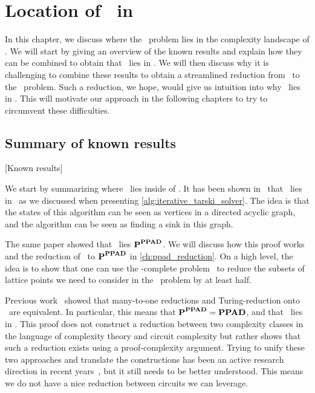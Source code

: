 \setchapterpreamble[u]{\margintoc}
\chapter{Location of \Tarski\ in \TFNP}\label{ch:location_tarski}

In this chapter, we discuss where the \Tarski\ problem lies in the complexity landscape of \TFNP\@. We will start by giving an overview of the known results and explain how they can be combined to obtain that \Tarski\ lies in \EOPL\@. We will then discuss why it is challenging to combine these results to obtain a streamlined reduction from \Tarski\ to the \EndOfPotentialLine\ problem. Such a reduction, we hope, would give us intuition into why \Tarski\ lies in \EOPL\@. This will motivate our approach in the following chapters to try to circumvent these difficulties.

\section{Summary of known results}[Known results]

We start by summarizing where \Tarski\ lies inside of \TFNP\@. It has been shown in~ that \Tarski\ lies in \PLS\ as we discussed when presenting \cref{alg:iterative_tarski_solver}. The idea is that the states of this algorithm can be seen as vertices in a directed acyclic graph, and the algorithm can be seen as finding a sink in this graph.

The same paper showed that \Tarski\ lies $\textbf{P}^{\textbf{PPAD}}$. We will discuss how this proof works and the reduction of \Tarski\ to $\textbf{P}^{\textbf{PPAD}}$ in \cref{ch:ppad_reduction}. On a high level, the idea is to show that one can use the \PPAD-complete problem \Brouwer\ to reduce the subsets of lattice points we need to consider in the \Tarski\ problem by at least half.

Previous work~ showed that many-to-one reductions and Turing-reduction onto \PPAD\ are equivalent. In particular, this means that $\textbf{P}^{\textbf{PPAD}} = \textbf{PPAD}$, and that \Tarski\ lies in \PPAD{}. This proof does not construct a reduction between two complexity classes in the language of complexity theory and circuit complexity but rather shows that such a reduction exists using a proof-complexity argument. Trying to unify these two approaches and translate the constructions has been an active research direction in recent years~, but it still needs to be better understood. This means we do not have a nice reduction between circuits we can leverage.

